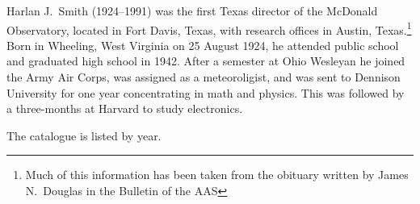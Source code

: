 
Harlan J.~Smith (1924--1991) was the first Texas director of the
McDonald Observatory, located in Fort Davis, Texas, with research
offices in Austin, Texas.\footnote{Much of this information has been
taken from the obituary written by James N.~Douglas in the Bulletin of
the AAS} Born in Wheeling, West Virginia on 25 August
1924, he attended public school and graduated high school in 1942. After
a semester at Ohio Wesleyan he joined the Army Air Corps, was assigned
as a meteoroligist, and was sent to Dennison University for one year
concentrating in math and physics. This was followed by a three-months
at Harvard to study electronics.

The catalogue is listed by year.
